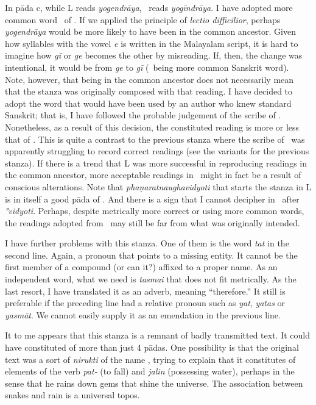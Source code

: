 In pāda c, while L reads \emph{yogendrāya}, \Tm\ reads \emph{yogīndrāya}. I have adopted more common word \yogindra\ of \Tm. If we applied the principle of \emph{lectio difficilior}, perhaps \emph{yogendrāya} would be more likely to have been in the common ancestor. Given how syllables with the vowel \emph{e} is written in the Malayalam script, it is hard to imagine how \emph{gī} or \emph{ge} becomes the other by misreading. If, then, the change was intentional, it would be from \emph{ge} to \emph{gī} (\yogindra\ being more common Sanskrit word). Note, however, that being in the common ancestor does not necessarily mean that the stanza was originally composed with that reading. I have decided to adopt the word that would have been used by an author who knew standard Sanskrit; that is, I have followed the probable judgement of the scribe of \Tm. Nonetheless, as a result of this decision, the constituted reading is more or less that of \Tm. This is quite a contrast to the previous stanza where the scribe of \Tm\ was apparently struggling to record correct readings (see the variants for the previous stanza). If there is a trend that L was more successful in reproducing readings in the common ancestor, more acceptable readings in \Tm\ might in fact be a result of conscious alterations. Note that \emph{phaṇa\-ratnau\-gha\-vidyoti} that starts the stanza in L is in itself a good pāda of \sloka. And there is a sign that I cannot decipher in \Tm\ after \emph{°vidyoti}. Perhaps, despite metrically more correct or using more common words, the readings adopted from \Tm\ may still be far from what was originally intended.

I have further problems with this stanza. One of them is the word \emph{tat} in the second line. Again, a pronoun that points to a missing entity. It cannot be the first member of a compound (or can it?) affixed to a proper name. As an independent word, what we need is \emph{tasmai} that does not fit metrically. As the last resort, I have translated it as an adverb, meaning ``therefore.'' It still is preferable if the preceding line had a relative pronoun such as \emph{yat}, \emph{yatas} or \emph{yasmāt}. We cannot easily supply it as an emendation in the previous line.

It to me appears that this stanza is a remnant of badly transmitted text. It could have constituted of more than just 4 pādas. One possibility is that the original text was a sort of \emph{nirukti} of the name \Patanjali, trying to explain that it constitutes of elements of the verb \emph{pat-} (to fall) and \emph{jalin} (possessing water), perhaps in the sense that he rains down gems that shine the universe. The association between snakes and rain is a universal topos. 

